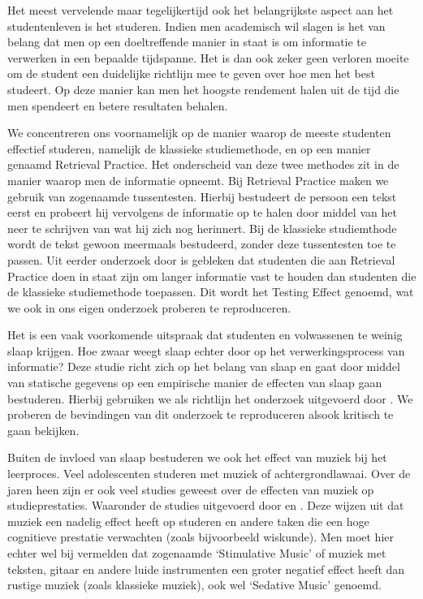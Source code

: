 \documentclass{hogent-article}
\begin{document}
Het meest vervelende maar tegelijkertijd ook het belangrijkste aspect aan het studentenleven is het studeren. Indien men academisch wil slagen is het van belang dat men op een doeltreffende manier in staat is om informatie te verwerken in een bepaalde tijdspanne. Het is dan ook zeker geen verloren moeite om de student een duidelijke richtlijn mee te geven over hoe men het best studeert. Op deze manier kan men het hoogste rendement halen uit de tijd die men spendeert en betere resultaten behalen.\\
\par
\noindent
We concentreren ons voornamelijk op de manier waarop de meeste studenten effectief studeren, namelijk de klassieke studiemethode, en op een manier genaamd Retrieval Practice. Het onderscheid van deze twee methodes zit in de manier waarop men de informatie opneemt. Bij Retrieval Practice maken we gebruik van zogenaamde tussentesten. Hierbij bestudeert de persoon een tekst eerst en probeert hij vervolgens de informatie op te halen door middel van het neer te schrijven van wat hij zich nog herinnert. Bij de klassieke studiemthode wordt de tekst gewoon meermaals bestudeerd, zonder deze tussentesten toe te passen. Uit eerder onderzoek door \textcite{Roediger2006} is gebleken dat studenten die aan Retrieval Practice doen in staat zijn om langer informatie vast te houden dan studenten die de klassieke studiemethode toepassen. Dit wordt het Testing Effect genoemd, wat we ook in ons eigen onderzoek proberen te reproduceren.\\
\par
\noindent
Het is een vaak voorkomende uitspraak dat studenten en volwassenen te weinig slaap krijgen. Hoe zwaar weegt slaap echter door op het verwerkingsprocess van informatie? Deze studie richt zich op het belang van slaap en gaat door middel van statische gegevens op een empirische manier de effecten van slaap gaan bestuderen. Hierbij gebruiken we als richtlijn het onderzoek uitgevoerd door \textcite{Potkin2012}. We proberen de bevindingen van dit onderzoek te reproduceren alsook kritisch te gaan bekijken.\\
\par
\noindent
Buiten de invloed van slaap bestuderen we ook het effect van muziek bij het leerproces. Veel adolescenten studeren met muziek of achtergrondlawaai. Over de jaren heen zijn er ook veel studies geweest over de effecten van muziek op studieprestaties. Waaronder de studies uitgevoerd door \textcite{Smith1977} en \textcite{Dolegui2013}. Deze wijzen uit dat muziek een nadelig effect heeft op studeren en andere taken die een hoge cognitieve prestatie verwachten (zoals bijvoorbeeld wiskunde). Men moet hier echter wel bij vermelden dat zogenaamde ‘Stimulative Music’ of muziek met teksten, gitaar en andere luide instrumenten een groter negatief effect heeft dan rustige muziek (zoals klassieke muziek), ook wel ‘Sedative Music’ genoemd.\\
\end{document}
